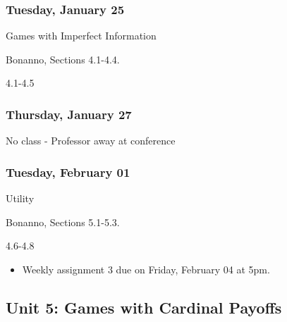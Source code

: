 \documentclass[
]{article}
\providecommand{\tightlist}{%
  \setlength{\itemsep}{0pt}\setlength{\parskip}{0pt}}
\begin{document}
\begin{multicols}{2}

\hypertarget{tuesday-january-25}{%
\subsubsection{Tuesday, January 25}\label{tuesday-january-25}}

\begin{description}
\tightlist
\item[Topic]
Games with Imperfect Information
\item[Reading]
Bonanno, Sections 4.1-4.4.
\item[Video lectures]
4.1-4.5
\end{description}

\hypertarget{thursday-january-27}{%
\subsubsection{Thursday, January 27}\label{thursday-january-27}}

No class - Professor away at conference

\end{multicols}

\hypertarget{tuesday-february-01}{%
\subsubsection{Tuesday, February 01}\label{tuesday-february-01}}

\begin{description}
\tightlist
\item[Topic]
Utility
\item[Reading]
Bonanno, Sections 5.1-5.3.
\item[Video lectures]
4.6-4.8
\end{description}

\begin{itemize}
\tightlist
\item
  Weekly assignment 3 due on Friday, February 04 at 5pm.
\end{itemize}

\hypertarget{unit-5-games-with-cardinal-payoffs}{%
\subsection{Unit 5: Games with Cardinal
Payoffs}\label{unit-5-games-with-cardinal-payoffs}}
\end{document}
